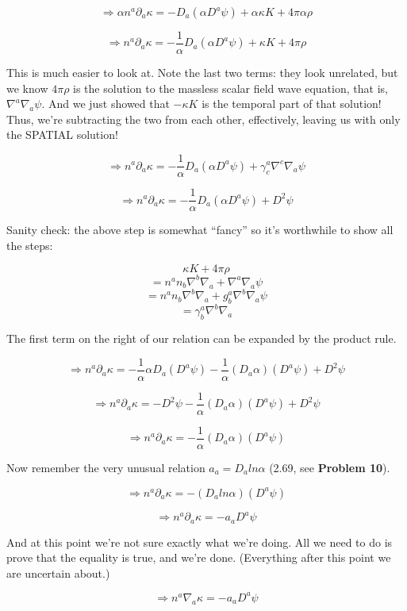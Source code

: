 \documentclass[landscape,letterpaper,10pt,english]{article}
\begin{document}
\[ \Rightarrow \alpha n^a \partial_a \kappa = -D_a(\alpha D^a \psi) + \alpha \kappa K + 4\pi \alpha\rho \]

\[ \Rightarrow n^a \partial_a \kappa = -\frac{1}{\alpha} D_a(\alpha D^a \psi) + \kappa K + 4 \pi \rho \]

This is much easier to look at. Note the last two terms: they look
unrelated, but we know \(4 \pi \rho\) is the solution to the massless
scalar field wave equation, that is, \(\nabla^a \nabla_a \psi\). And we
just showed that \(-\kappa K\) is the temporal part of that solution!
Thus, we're subtracting the two from each other, effectively, leaving us
with only the SPATIAL solution!

\[ \Rightarrow n^a \partial_a \kappa = -\frac{1}{\alpha} D_a(\alpha D^a \psi) + \gamma^a_c \nabla^c \nabla_a \psi \]

\[ \Rightarrow n^a \partial_a \kappa = -\frac{1}{\alpha} D_a(\alpha D^a \psi) + D^2 \psi \]

    Sanity check: the above step is somewhat ``fancy'' so it's worthwhile to
show all the steps:

\[ \kappa K + 4 \pi \rho \]
\[ = n^an_b\nabla^b\nabla_a + \nabla^a \nabla_a \psi \]
\[ = n^an_b\nabla^b\nabla_a + g^a_b \nabla^b \nabla_a \psi \]
\[ = \gamma^a_b \nabla^b\nabla_a \]

    The first term on the right of our relation can be expanded by the
product rule.

\[ \Rightarrow n^a \partial_a \kappa = -\frac{1}{\alpha} \alpha D_a( D^a \psi) -\frac{1}{\alpha} (D_a\alpha) (D^a \psi) + D^2 \psi \]

\[ \Rightarrow n^a \partial_a \kappa = - D^2 \psi - \frac{1}{\alpha} (D_a\alpha) (D^a \psi) + D^2 \psi \]

\[ \Rightarrow n^a \partial_a \kappa = - \frac{1}{\alpha} (D_a\alpha) (D^a \psi) \]

Now remember the very unusual relation \(a_a = D_a ln\alpha\) (2.69, see
\textbf{Problem 10}).

\[ \Rightarrow n^a \partial_a \kappa = - (D_a ln\alpha) (D^a \psi) \]

\[ \Rightarrow n^a \partial_a \kappa = - a_a D^a \psi \]

And at this point we're not sure exactly what we're doing. All we need
to do is prove that the equality is true, and we're done. (Everything
after this point we are uncertain about.)

    \[ \Rightarrow n^a \nabla_a \kappa = - a_a D^a \psi \]
\end{document}
